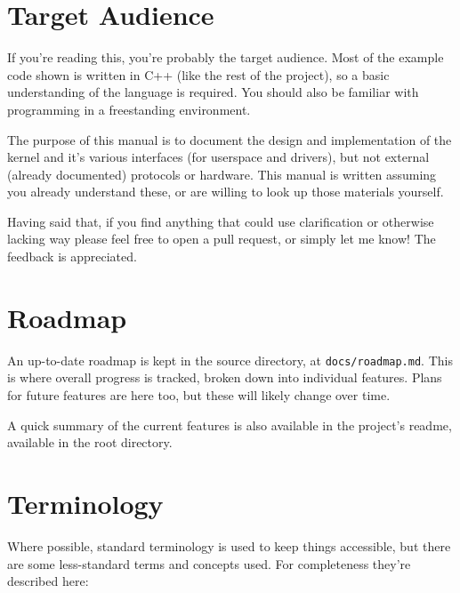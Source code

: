\section{Target Audience}
If you're reading this, you're probably the target audience. Most of the example code shown is written in C++ (like the rest of the project), so a basic understanding of the language is required. You should also be familiar with programming in a freestanding environment.

The purpose of this manual is to document the design and implementation of the kernel and it's various interfaces (for userspace and drivers), but not external (already documented) protocols or hardware. This manual is written assuming you already understand these, or are willing to look up those materials yourself.

Having said that, if you find anything that could use clarification or otherwise lacking way please feel free to open a pull request, or simply let me know! The feedback is appreciated.

\section{Roadmap}
An up-to-date roadmap is kept in the source directory, at \verb|docs/roadmap.md|. This is where overall progress is tracked, broken down into individual features. Plans for future features are here too, but these will likely change over time.

A quick summary of the current features is also available in the project's readme, available in the root directory.

\section{Terminology}
Where possible, standard terminology is used to keep things accessible, but there are some less-standard terms and concepts used. For completeness they're described here:

